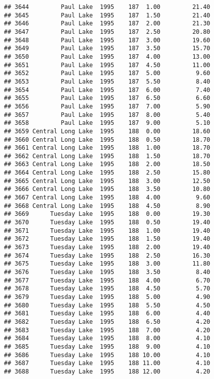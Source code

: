 \documentclass[
]{article}
\begin{document}
\begin{verbatim}
## 3644         Paul Lake  1995    187  1.00         21.40
## 3645         Paul Lake  1995    187  1.50         21.40
## 3646         Paul Lake  1995    187  2.00         21.30
## 3647         Paul Lake  1995    187  2.50         20.80
## 3648         Paul Lake  1995    187  3.00         19.60
## 3649         Paul Lake  1995    187  3.50         15.70
## 3650         Paul Lake  1995    187  4.00         13.00
## 3651         Paul Lake  1995    187  4.50         11.00
## 3652         Paul Lake  1995    187  5.00          9.60
## 3653         Paul Lake  1995    187  5.50          8.40
## 3654         Paul Lake  1995    187  6.00          7.40
## 3655         Paul Lake  1995    187  6.50          6.60
## 3656         Paul Lake  1995    187  7.00          5.90
## 3657         Paul Lake  1995    187  8.00          5.40
## 3658         Paul Lake  1995    187  9.00          5.10
## 3659 Central Long Lake  1995    188  0.00         18.60
## 3660 Central Long Lake  1995    188  0.50         18.70
## 3661 Central Long Lake  1995    188  1.00         18.70
## 3662 Central Long Lake  1995    188  1.50         18.70
## 3663 Central Long Lake  1995    188  2.00         18.50
## 3664 Central Long Lake  1995    188  2.50         15.80
## 3665 Central Long Lake  1995    188  3.00         12.50
## 3666 Central Long Lake  1995    188  3.50         10.80
## 3667 Central Long Lake  1995    188  4.00          9.60
## 3668 Central Long Lake  1995    188  4.50          8.90
## 3669      Tuesday Lake  1995    188  0.00         19.30
## 3670      Tuesday Lake  1995    188  0.50         19.40
## 3671      Tuesday Lake  1995    188  1.00         19.40
## 3672      Tuesday Lake  1995    188  1.50         19.40
## 3673      Tuesday Lake  1995    188  2.00         19.40
## 3674      Tuesday Lake  1995    188  2.50         16.30
## 3675      Tuesday Lake  1995    188  3.00         11.80
## 3676      Tuesday Lake  1995    188  3.50          8.40
## 3677      Tuesday Lake  1995    188  4.00          6.70
## 3678      Tuesday Lake  1995    188  4.50          5.70
## 3679      Tuesday Lake  1995    188  5.00          4.90
## 3680      Tuesday Lake  1995    188  5.50          4.50
## 3681      Tuesday Lake  1995    188  6.00          4.40
## 3682      Tuesday Lake  1995    188  6.50          4.20
## 3683      Tuesday Lake  1995    188  7.00          4.20
## 3684      Tuesday Lake  1995    188  8.00          4.10
## 3685      Tuesday Lake  1995    188  9.00          4.10
## 3686      Tuesday Lake  1995    188 10.00          4.10
## 3687      Tuesday Lake  1995    188 11.00          4.10
## 3688      Tuesday Lake  1995    188 12.00          4.20

\end{verbatim}
\end{document}
